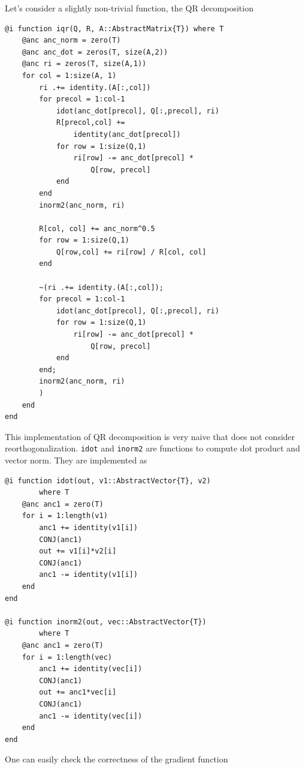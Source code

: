 \documentclass[aps,twocolumn,longbibliography,english,superscriptaddress]{revtex4-1}
\newcommand{\<}{\langle}
\renewcommand{\>}{\rangle}
\theoremstyle{definition}\newtheorem{definition}{\textit{Definition}}
\begin{document}
Let's consider a slightly non-trivial function, the QR decomposition

\begin{minipage}{.44\textwidth}
\begin{lstlisting}
@i function iqr(Q, R, A::AbstractMatrix{T}) where T
    @anc anc_norm = zero(T)
    @anc anc_dot = zeros(T, size(A,2))
    @anc ri = zeros(T, size(A,1))
    for col = 1:size(A, 1)
        ri .+= identity.(A[:,col])
        for precol = 1:col-1
            idot(anc_dot[precol], Q[:,precol], ri)
            R[precol,col] +=
                identity(anc_dot[precol])
            for row = 1:size(Q,1)
                ri[row] -= anc_dot[precol] *
                    Q[row, precol]
            end
        end
        inorm2(anc_norm, ri)

        R[col, col] += anc_norm^0.5
        for row = 1:size(Q,1)
            Q[row,col] += ri[row] / R[col, col]
        end

        ~(ri .+= identity.(A[:,col]);
        for precol = 1:col-1
            idot(anc_dot[precol], Q[:,precol], ri)
            for row = 1:size(Q,1)
                ri[row] -= anc_dot[precol] *
                    Q[row, precol]
            end
        end;
        inorm2(anc_norm, ri)
        )
    end
end
\end{lstlisting}
\end{minipage}

This implementation of QR decomposition is very naive that does not consider reorthogonalization.
\texttt{idot} and \texttt{inorm2} are functions to compute dot product and vector norm.
They are implemented as

\begin{minipage}{.44\textwidth}
\begin{lstlisting}
@i function idot(out, v1::AbstractVector{T}, v2)
        where T
    @anc anc1 = zero(T)
    for i = 1:length(v1)
        anc1 += identity(v1[i])
        CONJ(anc1)
        out += v1[i]*v2[i]
        CONJ(anc1)
        anc1 -= identity(v1[i])
    end
end

@i function inorm2(out, vec::AbstractVector{T})
        where T
    @anc anc1 = zero(T)
    for i = 1:length(vec)
        anc1 += identity(vec[i])
        CONJ(anc1)
        out += anc1*vec[i]
        CONJ(anc1)
        anc1 -= identity(vec[i])
    end
end
\end{lstlisting}
\end{minipage}

One can easily check the correctness of the gradient function
\end{document}
